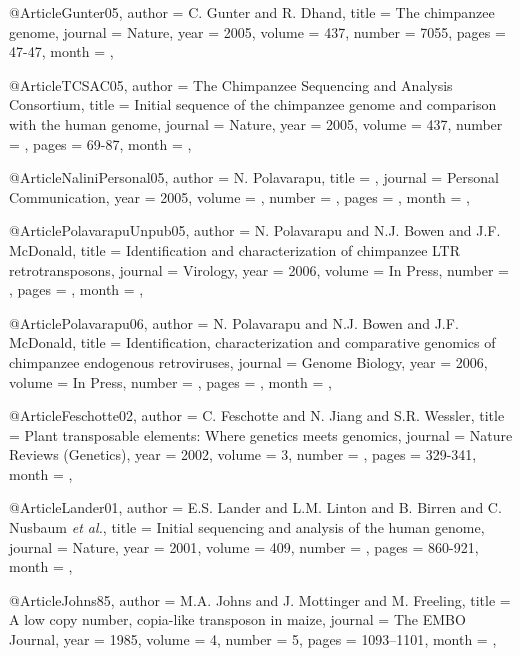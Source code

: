 @Article{Gunter05,
  author = 	 {C. Gunter and R. Dhand},
  title = 	 {The chimpanzee genome},
  journal =  {Nature},
  year = 	 {2005},
  volume = 	 {437},
  number = 	 {7055},
  pages = 	 {47-47},
  month = 	 {},
}


@Article{TCSAC05,
  author = 	 {The Chimpanzee Sequencing and Analysis Consortium},
  title = 	 {Initial sequence of the chimpanzee genome and comparison with the human genome},
  journal =  {Nature},
  year = 	 {2005},
  volume = 	 {437},
  number = 	 {},
  pages = 	 {69-87},
  month = 	 {},
}



@Article{NaliniPersonal05,
  author = 	 {N. Polavarapu},
  title = 	 {},
  journal =  {Personal Communication},
  year = 	 {2005},
  volume = 	 {},
  number = 	 {},
  pages = 	 {},
  month = 	 {},
}

@Article{PolavarapuUnpub05,
  author =   {N. Polavarapu and  N.J. Bowen and J.F. McDonald},
  title =    {{Identification and characterization of chimpanzee LTR retrotransposons}},
  journal =  {Virology},
  year =     {2006},
  volume =   {In Press},
  number =   {},
  pages =    {},
  month =    {},
}


@Article{Polavarapu06,
  author =   {N. Polavarapu and  N.J. Bowen and J.F. McDonald},
  title =    {{Identification, characterization and comparative genomics of chimpanzee endogenous retroviruses}},
  journal =  {Genome Biology},
  year =     {2006},
  volume =   {In Press},
  number =   {},
  pages =    {},
  month =    {},
}



@Article{Feschotte02,
  author =   {C. Feschotte and N. Jiang and S.R. Wessler},
  title =    {{Plant transposable elements: Where genetics meets genomics}},
  journal =  {Nature Reviews (Genetics)},
  year =     {2002},
  volume =   {3},
  number =   {},
  pages =    {329-341},
  month =    {},
}


@Article{Lander01,
  author =   {E.S. Lander and L.M. Linton and B. Birren and C. Nusbaum {\it et al.}},
  title =    {Initial sequencing and analysis of the human genome},
  journal =  {Nature},
  year =     {2001},
  volume =   {409},
  number =   {},
  pages =    {860-921},
  month =    {},
}


@Article{Johns85,
  author =   {M.A. Johns and J. Mottinger and M. Freeling},
  title =    {A low copy number, copia-like transposon in maize},
  journal =  {{The EMBO Journal}},
  year =     {1985},
  volume =   {4},
  number =   {5},
  pages =    {1093–1101},
  month =    {},
}

